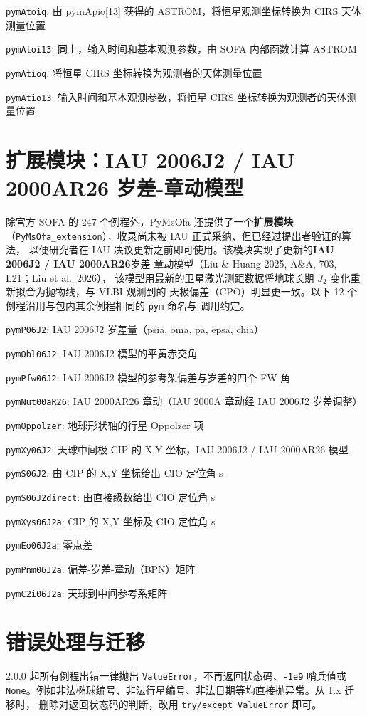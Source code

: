 \documentclass[11pt]{article}
\begin{document}
\texttt{pymAtoiq}: 由 pymApio[13] 获得的 ASTROM，将恒星观测坐标转换为 CIRS 天体测量位置

\texttt{pymAtoi13}: 同上，输入时间和基本观测参数，由 SOFA 内部函数计算 ASTROM

\texttt{pymAtioq}: 将恒星 CIRS 坐标转换为观测者的天体测量位置

\texttt{pymAtio13}: 输入时间和基本观测参数，将恒星 CIRS 坐标转换为观测者的天体测量位置

\section{扩展模块：IAU 2006J2 / IAU 2000AR26 岁差-章动模型}

除官方 SOFA 的 247 个例程外，PyMsOfa 还提供了一个\textbf{扩展模块}
（\texttt{PyMsOfa\_extension}），收录尚未被 IAU 正式采纳、但已经过提出者验证的算法，
以便研究者在 IAU 决议更新之前即可使用。该模块实现了更新的\textbf{IAU 2006J2 /
IAU 2000AR26}岁差-章动模型（Liu \& Huang 2025, A\&A, 703, L21；Liu et al.\ 2026），
该模型用最新的卫星激光测距数据将地球长期 $J_2$ 变化重新拟合为抛物线，与 VLBI 观测到的
天极偏差（CPO）明显更一致。以下 12 个例程沿用与包内其余例程相同的 \texttt{pym} 命名与
调用约定。

\texttt{pymP06J2}: IAU 2006J2 岁差量（psia, oma, pa, epsa, chia）

\texttt{pymObl06J2}: IAU 2006J2 模型的平黄赤交角

\texttt{pymPfw06J2}: IAU 2006J2 模型的参考架偏差与岁差的四个 FW 角

\texttt{pymNut00aR26}: IAU 2000AR26 章动（IAU 2000A 章动经 IAU 2006J2 岁差调整）

\texttt{pymOppolzer}: 地球形状轴的行星 Oppolzer 项

\texttt{pymXy06J2}: 天球中间极 CIP 的 X,Y 坐标，IAU 2006J2 / IAU 2000AR26 模型

\texttt{pymS06J2}: 由 CIP 的 X,Y 坐标给出 CIO 定位角 s

\texttt{pymS06J2direct}: 由直接级数给出 CIO 定位角 s

\texttt{pymXys06J2a}: CIP 的 X,Y 坐标及 CIO 定位角 s

\texttt{pymEo06J2a}: 零点差

\texttt{pymPnm06J2a}: 偏差-岁差-章动（BPN）矩阵

\texttt{pymC2i06J2a}: 天球到中间参考系矩阵
\section{错误处理与迁移}
2.0.0 起所有例程出错一律抛出 \texttt{ValueError}，不再返回状态码、\texttt{-1e9} 哨兵值或
\texttt{None}。例如非法椭球编号、非法行星编号、非法日期等均直接抛异常。从 1.x 迁移时，
删除对返回状态码的判断，改用 \texttt{try/except ValueError} 即可。
\end{document}
